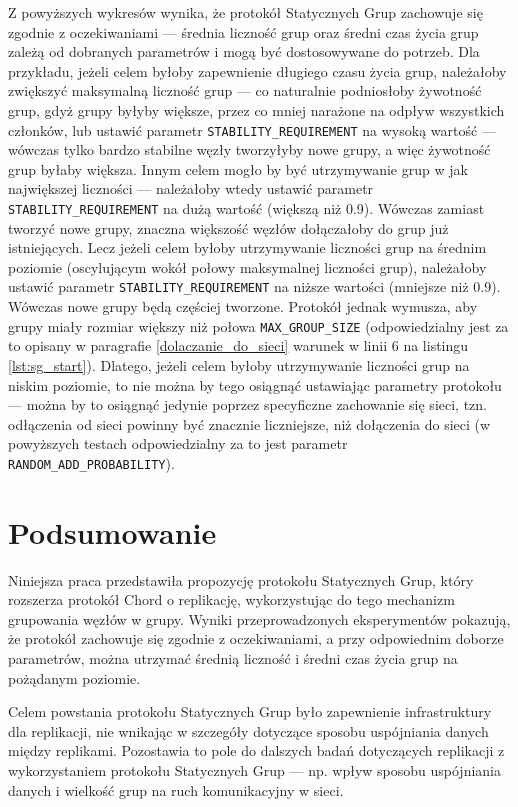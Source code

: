 \documentclass[12pt, twoside, openany]{report}
\begin{document}
Z powyższych wykresów wynika, że protokół Statycznych Grup zachowuje się zgodnie z oczekiwaniami --- średnia liczność grup oraz średni czas życia grup zależą od dobranych parametrów i mogą być dostosowywane do potrzeb. Dla przykładu, jeżeli celem byłoby zapewnienie długiego czasu życia grup, należałoby zwiększyć maksymalną liczność grup --- co naturalnie podniosłoby żywotność grup, gdyż grupy byłyby większe, przez co mniej narażone na odpływ wszystkich członków, lub ustawić parametr \texttt{STABILITY\_REQUIREMENT} na wysoką wartość --- wówczas tylko bardzo stabilne węzły tworzyłyby nowe grupy, a więc żywotność grup byłaby większa. Innym celem mogło by być utrzymywanie grup w jak największej liczności --- należałoby wtedy ustawić parametr \texttt{STABILITY\_REQUIREMENT} na dużą wartość (większą niż 0.9). Wówczas zamiast tworzyć nowe grupy, znaczna większość węzłów dołączałoby do grup już istniejących. Lecz jeżeli celem byłoby utrzymywanie liczności grup na średnim poziomie (oscylującym wokół połowy maksymalnej liczności grup), należałoby ustawić parametr \texttt{STABILITY\_REQUIREMENT} na niższe wartości (mniejsze niż 0.9). Wówczas nowe grupy będą częściej tworzone. Protokół jednak wymusza, aby grupy miały rozmiar większy niż połowa \texttt{MAX\_GROUP\_SIZE} (odpowiedzialny jest za to opisany w paragrafie \ref{dolaczanie_do_sieci} warunek w linii 6 na listingu \ref{lst:sg_start}). Dlatego, jeżeli celem byłoby utrzymywanie liczności grup na niskim poziomie, to nie można by tego osiągnąć ustawiając parametry protokołu --- można by to osiągnąć jedynie poprzez specyficzne zachowanie się sieci, tzn. odłączenia od sieci powinny być znacznie liczniejsze, niż dołączenia do sieci (w powyższych testach odpowiedzialny za to jest parametr \texttt{RANDOM\_ADD\_PROBABILITY}).

\chapter{Podsumowanie}

Niniejsza praca przedstawiła propozycję protokołu Statycznych Grup, który rozszerza protokół Chord o replikację, wykorzystując do tego mechanizm grupowania węzłów w grupy. Wyniki przeprowadzonych eksperymentów pokazują, że protokół zachowuje się zgodnie z oczekiwaniami, a przy odpowiednim doborze parametrów, można utrzymać średnią liczność i średni czas życia grup na pożądanym poziomie.

Celem powstania protokołu Statycznych Grup było zapewnienie infrastruktury dla replikacji, nie wnikając w szczegóły dotyczące sposobu uspójniania danych między replikami. Pozostawia to pole do dalszych badań dotyczących replikacji z wykorzystaniem protokołu Statycznych Grup --- np. wpływ sposobu uspójniania danych i wielkość grup na ruch komunikacyjny w sieci.
\end{document}
